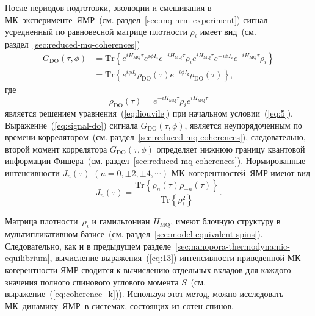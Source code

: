 После периодов подготовки, эволюции и смешивания в МК~эксперименте~ЯМР~(см. раздел~\ref{sec:mq-nrm-experiment})
сигнал усредненный по равновесной матрице плотности $\rho_i$
имеет вид~(см. раздел~\ref{sec:reduced-mq-coherences})
%
\begin{equation}\label{eq:signal-do}
  \begin{split}
    G_\mathrm{DO}(\tau,\phi)
    & = \mathrm{Tr}\left\{
      e^{i H_\mathrm{MQ} \tau} e^{i\phi I_\mathrm{z}} e^{-i H_\mathrm{MQ}\tau}
      \rho_i
      e^{i H_\mathrm{MQ} \tau} e^{-i \phi I_\mathrm{z}} e^{-i H_\mathrm{MQ} \tau}
      \rho_i
    \right\} \\
    & = \mathrm{Tr} \left\{
    e^{i \phi I_\mathrm{z}}
    \rho_\mathrm{DO}(\tau)
    e^{-i \phi I_\mathrm{z}}
    \rho_\mathrm{DO}(\tau)
    \right\},
  \end{split}
\end{equation}
%
где
%
\begin{equation}
  \label{eq:9}
  \rho_\mathrm{DO}(\tau)
  = e^{-i H_\mathrm{MQ} \tau }
  \rho_i
  e^{i H_\mathrm{MQ} \tau}
\end{equation}
%
является решением уравнения~(\ref{eq:liouvile}) при начальном условии~(\ref{eq:5}).
Выражение~(\ref{eq:signal-do}) сигнала  $G_\mathrm{DO}(\tau,\phi)$,
является неупорядоченным по времени коррелятором~(см. раздел~\ref{sec:reduced-mq-coherences}),
следовательно, второй момент коррелятора $G_\mathrm{DO}(\tau,\phi)$ определяет
нижнюю границу квантовой информации Фишера~(см. раздел~\ref{sec:reduced-mq-coherences}).
Нормированные интенсивности $J_{n}(\tau)$ $(n=0, \pm 2, \pm 4, \cdots)$ МК~когерентностей~ЯМР
имеют вид
%
\begin{equation}\label{eq:13}
  J_{n}(\tau) = \dfrac{\mathrm{Tr} \left\{
  \rho_{n}(\tau) \rho_{-n}(\tau)
  \right\}}
  {\mathrm{Tr} \left\{\rho^2_{i} \right\}}.
\end{equation}


Матрица плотности~$\rho_i$ и гамильтониан $H_\mathrm{MQ}$,
имеют блочную структуру в мультипликативном базисе~(см. раздел~\ref{sec:model-equivalent-spins}).
Следовательно, как и в предыдущем разделе~\ref{sec:nanopora-thermodynamic-equilibrium},
вычисление выражения~(\ref{eq:13}) интенсивности приведенной МК когерентности ЯМР сводится
к вычислению отдельных вкладов
для каждого значения полного спинового углового момента $S$~(см. выражение~(\ref{eq:coherence_k})).
Используя этот метод, можно исследовать МК~динамику~ЯМР~в системах, состоящих из сотен спинов.


